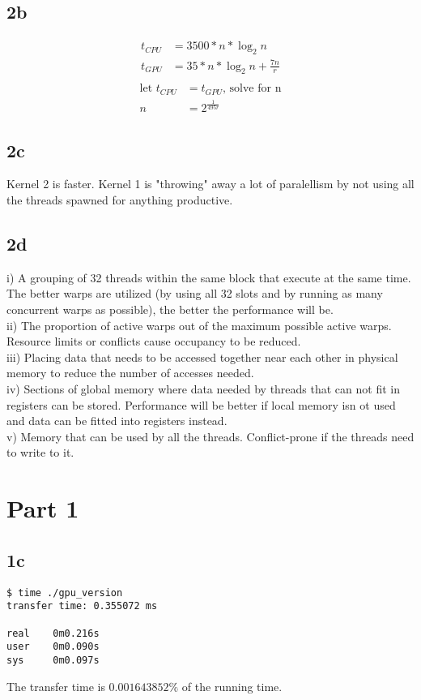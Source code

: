 \subsection*{2b}
\begin{align*}
    t_{CPU} &= 3500*n*\log_2{n}\\
    t_{GPU} &= 35*n*\log_2{n} + \frac{7n}{r}\\
\end{align*}
\begin{align*}
    \text{let~} t_{CPU} &= t_{GPU} \text{, solve for n} \\
    n &= 2^{\frac{1}{495r}}
\end{align*}

\subsection*{2c}
Kernel 2 is faster.
Kernel 1 is "throwing" away a lot of paralellism by not using all the threads spawned for anything productive.

\subsection*{2d}
i) A grouping of 32 threads within the same block that execute at the same time.
The better warps are utilized (by using all 32 slots and by running as many concurrent warps as possible), the better the performance will be. \\
ii) The proportion of active warps out of the maximum possible active warps.
Resource limits or conflicts cause occupancy to be reduced.\\
iii) Placing data that needs to be accessed together near each other in physical memory to reduce the number of accesses needed.\\
iv) Sections of global memory where data needed by threads that can not fit in registers can be stored.
Performance will be better if local memory isn ot used and data can be fitted into registers instead.\\
v) Memory that can be used by all the threads.
Conflict-prone if the threads need to write to it.

\section*{Part 1}
\subsection*{1c}
\begin{verbatim}
$ time ./gpu_version
transfer time: 0.355072 ms

real    0m0.216s
user    0m0.090s
sys     0m0.097s
\end{verbatim}

The transfer time is $0.001643852\%$ of the running time.
